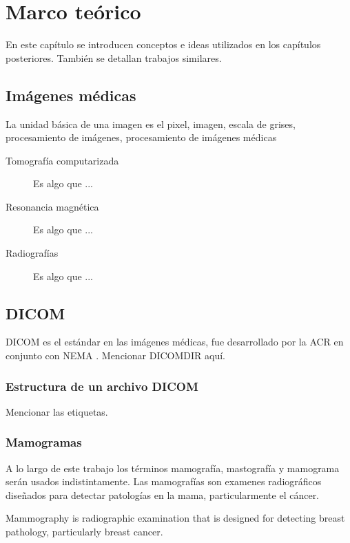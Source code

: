 \chapter{Marco teórico}

En este capítulo se introducen conceptos e ideas utilizados en los capítulos
posteriores. También se detallan trabajos similares.

\section{Imágenes médicas}

La unidad básica de una imagen es el pixel, imagen, escala de grises,
procesamiento de imágenes, procesamiento de imágenes médicas
\cite{suetens2009fundamentals}

\begin{description}
    \item[Tomografía computarizada] Es algo que ...
    \item[Resonancia magnética] Es algo que ...
    \item[Radiografías] Es algo que ...
\end{description}

\section{DICOM}

DICOM es el estándar en las imágenes médicas, fue desarrollado por la ACR en
conjunto con NEMA \cite{acrnema, pianykh2011digital}.
Mencionar DICOMDIR aquí.

\subsection{Estructura de un archivo DICOM}
Mencionar las etiquetas.

\subsection{Mamogramas}

A lo largo de este trabajo los términos mamografía, mastografía y mamograma
serán usados indistintamente. Las mamografías son examenes radiográficos
diseñados para detectar patologías en la mama, particularmente el cáncer.

Mammography is radiographic examination that is designed for detecting breast
pathology, particularly breast cancer. \cite{bushberg2011essential}

